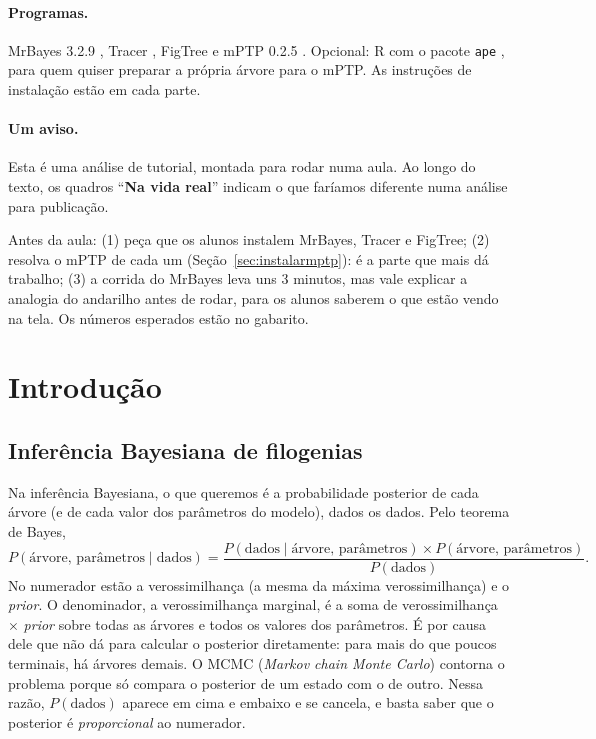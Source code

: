 \documentclass[11pt,a4paper]{article}
\newcommand{\cmd}[1]{\texttt{#1}}
\begin{document}
\paragraph{Programas.} MrBayes 3.2.9 \cite{ronquist2012}, Tracer \cite{rambaut2018},
FigTree e mPTP 0.2.5 \cite{kapli2017}. Opcional: R com o pacote \cmd{ape} \cite{paradis2019},
para quem quiser preparar a própria árvore para o mPTP. As instruções de instalação estão em
cada parte.

\paragraph{Um aviso.} Esta é uma análise de tutorial, montada para rodar numa aula. Ao longo do
texto, os quadros ``\textbf{Na vida real}'' indicam o que faríamos diferente numa análise para
publicação.

\begin{resposta}
Antes da aula: (1) peça que os alunos instalem MrBayes, Tracer e FigTree;
(2) resolva o mPTP de cada um (Seção~\ref{sec:instalarmptp}): é a parte que mais dá trabalho;
(3) a corrida do MrBayes leva uns 3 minutos, mas vale explicar a analogia do andarilho antes de rodar, para os alunos saberem o que
estão vendo na tela. Os números esperados estão no gabarito.
\end{resposta}

\section{Introdução}

\subsection{Inferência Bayesiana de filogenias}

Na inferência Bayesiana, o que queremos é a probabilidade posterior de cada árvore (e de cada
valor dos parâmetros do modelo), dados os dados. Pelo teorema de Bayes,
\[
P(\text{árvore, parâmetros} \mid \text{dados}) =
\frac{P(\text{dados} \mid \text{árvore, parâmetros}) \times P(\text{árvore, parâmetros})}
{P(\text{dados})}.
\]
No numerador estão a verossimilhança (a mesma da máxima verossimilhança) e o \emph{prior}. O
denominador, a verossimilhança marginal, é a soma de verossimilhança $\times$ \emph{prior} sobre
todas as árvores e todos os valores dos parâmetros. É por causa dele que não dá para calcular o
posterior diretamente: para mais do que poucos terminais, há árvores demais. O MCMC
(\emph{Markov chain Monte Carlo}) contorna o problema porque só compara o posterior de um estado
com o de outro. Nessa razão, $P(\text{dados})$ aparece em cima e embaixo e se cancela, e basta
saber que o posterior é \emph{proporcional} ao numerador.
\end{document}
